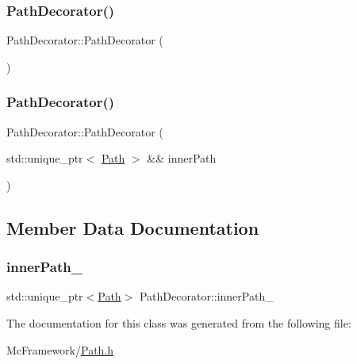 \subsubsection{\texorpdfstring{Path\+Decorator()}{PathDecorator()}\hspace{0.1cm}{\footnotesize\ttfamily [1/2]}}
{\footnotesize\ttfamily Path\+Decorator\+::\+Path\+Decorator (\begin{DoxyParamCaption}{ }\end{DoxyParamCaption})\hspace{0.3cm}{\ttfamily [default]}}

\hypertarget{class_path_decorator_a26a8109e1d038f59140a243f1ceb6084}{}\label{class_path_decorator_a26a8109e1d038f59140a243f1ceb6084} 
\subsubsection{\texorpdfstring{Path\+Decorator()}{PathDecorator()}\hspace{0.1cm}{\footnotesize\ttfamily [2/2]}}
{\footnotesize\ttfamily Path\+Decorator\+::\+Path\+Decorator (\begin{DoxyParamCaption}\item[{std\+::unique\+\_\+ptr$<$ \hyperlink{class_path}{Path} $>$ \&\&}]{inner\+Path }\end{DoxyParamCaption})\hspace{0.3cm}{\ttfamily [inline]}}



\subsection{Member Data Documentation}
\hypertarget{class_path_decorator_a91f1257f216052a32b4ea78feb9d0755}{}\label{class_path_decorator_a91f1257f216052a32b4ea78feb9d0755} 
\subsubsection{\texorpdfstring{inner\+Path\+\_\+}{innerPath\_}}
{\footnotesize\ttfamily std\+::unique\+\_\+ptr$<$\hyperlink{class_path}{Path}$>$ Path\+Decorator\+::inner\+Path\+\_\+\hspace{0.3cm}{\ttfamily [protected]}}



The documentation for this class was generated from the following file\+:\begin{DoxyCompactItemize}
\item 
Mc\+Framework/\hyperlink{_path_8h}{Path.\+h}\end{DoxyCompactItemize}

